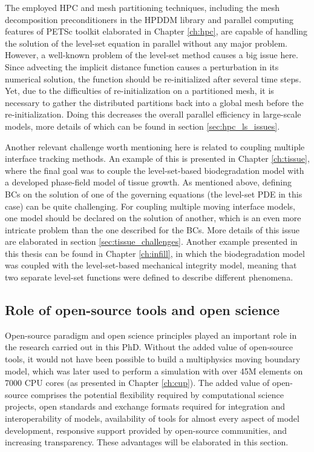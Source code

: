 The employed \gls{HPC} and mesh partitioning techniques, including the mesh decomposition preconditioners in the \gls{HPDDM} library and parallel computing features of \gls{PETSc} toolkit elaborated in Chapter \ref{ch:hpc}, are capable of handling the solution of the level-set equation in parallel without any major problem. However, a well-known problem of the level-set method causes a big issue here. Since advecting the implicit distance function causes a perturbation in its numerical solution, the function should be re-initialized after several time steps. Yet, due to the difficulties of re-initialization on a partitioned mesh, it is necessary to gather the distributed partitions back into a global mesh before the re-initialization. Doing this decreases the overall parallel efficiency in large-scale models, more details of which can be found in section \ref{sec:hpc_ls_issues}.

Another relevant challenge worth mentioning here is related to coupling multiple interface tracking methods. An example of this is presented in Chapter \ref{ch:tissue}, where the final goal was to couple the level-set-based biodegradation model with a developed phase-field model of tissue growth. As mentioned above, defining BCs on the solution of one of the governing equations (the level-set \gls{PDE} in this case) can be quite challenging. For coupling multiple moving interface models, one model should be declared on the solution of another, which is an even more intricate problem than the one described for the BCs. More details of this issue are elaborated in section \ref{sec:tissue_challenges}. Another example presented in this thesis can be found in Chapter \ref{ch:infill}, in which the biodegradation model was coupled with the level-set-based mechanical integrity model, meaning that two separate level-set functions were defined to describe different phenomena.


\subsection{Role of open-source tools and open science} \label{sec:open_source}

Open-source paradigm and open science principles played an important role in the research carried out in this PhD. Without the added value of open-source tools, it would not have been possible to build a multiphysics moving boundary model, which was later used to perform a simulation with over 45M elements on 7000 \gls{CPU} cores (as presented in Chapter \ref{ch:cup}). The added value of open-source comprises the potential flexibility required by computational science projects, open standards and exchange formats required for integration and interoperability of models, availability of tools for almost every aspect of model development, responsive support provided by open-source communities, and increasing transparency. These advantages will be elaborated in this section.

